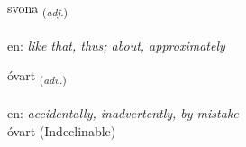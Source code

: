 \documentclass[frontgrid, backgrid]{flacards}\usepackage[]{graphicx}\usepackage[]{color}
\begin{document}
\renewcommand{\flhead}{\vskip5pt \fboxsep=0pt {\small\bfseries\footnotesize Lýsingarorð | Adjective}}
\renewcommand{\fcfoot}{\vskip5pt \fboxsep=0pt \hspace{2pt}{\small\bfseries\footnotesize 2K}}

\renewcommand{\blhead}{\vskip5pt {\small\bfseries\footnotesize Lýsingarorð | Adjective }}
\renewcommand{\bcfoot}{\vskip5pt \hspace{2pt}{\small\bfseries\footnotesize 2K}}


{svona \small{\textsubscript{(\textit{adj.})}} \\[1ex] %
\textphonetic{[svɔːna]} \\
en: \emph{like that, thus; about, approximately} \\  [2ex]
\renewcommand*{\arraystretch}{0.8}
}


\renewcommand{\flhead}{\vskip5pt \fboxsep=0pt {\small\bfseries\footnotesize Atviksorð | Adverb}}
\renewcommand{\fcfoot}{\vskip5pt \fboxsep=0pt \hspace{2pt}{\small\bfseries\footnotesize 2K}}

\renewcommand{\blhead}{\vskip5pt {\small\bfseries\footnotesize Atviksorð | Adverb }}
\renewcommand{\bcfoot}{\vskip5pt \hspace{2pt}{\small\bfseries\footnotesize 2K}}


{óvart \small{\textsubscript{(\textit{adv.})}} \\[1ex]
\textphonetic{[ouːvar̥t]} \\
en: \emph{accidentally, inadvertently, by mistake} \\  [2ex]
óvart (Indeclinable)}

\renewcommand{\flhead}{\vskip5pt \fboxsep=0pt {\small\bfseries\footnotesize Lýsingarorð | Adjective}}
\renewcommand{\fcfoot}{\vskip5pt \fboxsep=0pt \hspace{2pt}{\small\bfseries\footnotesize 2K}}
\end{document}
